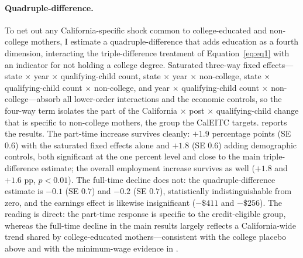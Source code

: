 \documentclass[11pt]{article}
\let\Cref\crtCref
\begin{document}
\paragraph{Quadruple-difference.} To net out any California-specific shock common to college-educated and non-college mothers, I estimate a quadruple-difference that adds education as a fourth dimension, interacting the triple-difference treatment of Equation~\eqref{eq:eq1} with an indicator for not holding a college degree. Saturated three-way fixed effects---state $\times$ year $\times$ qualifying-child count, state $\times$ year $\times$ non-college, state $\times$ qualifying-child count $\times$ non-college, and year $\times$ qualifying-child count $\times$ non-college---absorb all lower-order interactions and the economic controls, so the four-way term isolates the part of the California $\times$ post $\times$ qualifying-child change that is specific to non-college mothers, the group the CalEITC targets. \Cref{tab:quad_diff} reports the results. The part-time increase survives cleanly: $+1.9$ percentage points (SE $0.6$) with the saturated fixed effects alone and $+1.8$ (SE $0.6$) adding demographic controls, both significant at the one percent level and close to the main triple-difference estimate; the overall employment increase survives as well ($+1.8$ and $+1.6$ pp, $p<0.01$). The full-time decline does not: the quadruple-difference estimate is $-0.1$ (SE $0.7$) and $-0.2$ (SE $0.7$), statistically indistinguishable from zero, and the earnings effect is likewise insignificant ($-\$411$ and $-\$256$). The reading is direct: the part-time response is specific to the credit-eligible group, whereas the full-time decline in the main results largely reflects a California-wide trend shared by college-educated mothers---consistent with the college placebo above and with the minimum-wage evidence in \Cref{sec:threats}.
\end{document}
